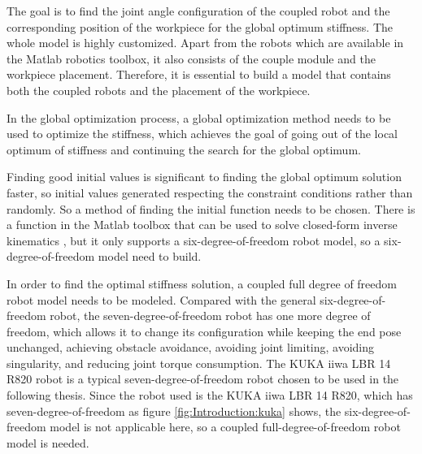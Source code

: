 The goal is to find the joint angle configuration of the coupled robot and the corresponding position of the workpiece for the global optimum stiffness. The whole model is highly customized. Apart from the robots which are available in the Matlab robotics toolbox, it also consists of the couple module and the workpiece placement. Therefore, it is essential to build a model that contains both the coupled robots and the placement of the workpiece.\par
In the global optimization process, a global optimization method needs to be used to optimize the stiffness, which achieves the goal of going out of the local optimum of stiffness and continuing the search for the global optimum.\par
Finding good initial values is significant to finding the global optimum solution faster, so initial values generated respecting the constraint conditions rather than randomly. So a method of finding the initial function needs to be chosen. There is a function in the Matlab toolbox that can be used to solve closed-form inverse kinematics \cite{AIK}, but it only supports a six-degree-of-freedom robot model, so a six-degree-of-freedom model need to build.\par
In order to find the optimal stiffness solution, a coupled full degree of freedom robot model needs to be modeled. Compared with the general six-degree-of-freedom robot, the seven-degree-of-freedom robot has one more degree of freedom, which allows it to change its configuration while keeping the end pose unchanged, achieving obstacle avoidance, avoiding joint limiting, avoiding singularity, and reducing joint torque consumption. The KUKA iiwa LBR 14 R820 robot \cite{kuka_datasheet} is a typical seven-degree-of-freedom robot chosen to be used in the following thesis. Since the robot used is the KUKA iiwa LBR 14 R820, which has seven-degree-of-freedom as figure \ref{fig:Introduction:kuka} shows, the six-degree-of-freedom model is not applicable here, so a coupled full-degree-of-freedom robot model is needed.\par
